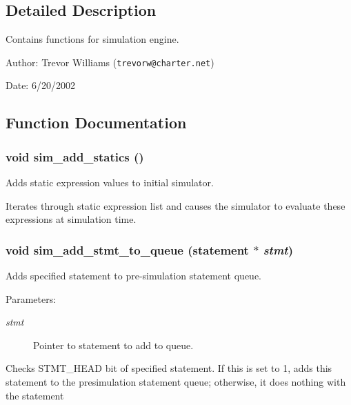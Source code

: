 \subsection{Detailed Description}
Contains functions for simulation engine. 

\begin{Desc}
\item[Author:]Trevor Williams ({\tt trevorw@charter.net}) \end{Desc}
\begin{Desc}
\item[Date:]6/20/2002 \end{Desc}


\subsection{Function Documentation}
\subsubsection{\setlength{\rightskip}{0pt plus 5cm}void sim\_\-add\_\-statics ()}\label{sim_8h_a5}


Adds static expression values to initial simulator. 

Iterates through static expression list and causes the simulator to evaluate these expressions at simulation time. 
\subsubsection{\setlength{\rightskip}{0pt plus 5cm}void sim\_\-add\_\-stmt\_\-to\_\-queue ({\bf statement} $\ast$ {\em stmt})}\label{sim_8h_a1}


Adds specified statement to pre-simulation statement queue. 

\begin{Desc}
\item[Parameters:]
\begin{description}
\item[{\em stmt}]Pointer to statement to add to queue.\end{description}
\end{Desc}
Checks STMT\_\-HEAD bit of specified statement. If this is set to 1, adds this statement to the presimulation statement queue; otherwise, it does nothing with the statement 

